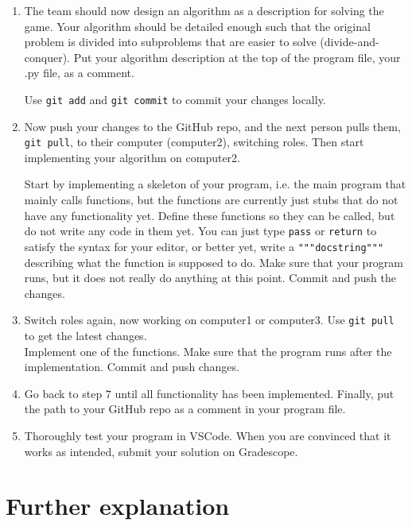 \begin{enumerate}
    \item
    The team should now design an algorithm as a description for solving the game.
    Your algorithm should be detailed enough
    such that the original problem is divided into subproblems
    that are easier to solve (divide-and-conquer).
    Put your algorithm description at the top of the program file, your .py file, as a comment.

    Use \texttt{git add} and \texttt{git commit} to commit your changes locally.

    \item
    Now push your changes to the GitHub repo,
    and the next person pulls them, \texttt{git pull}, to their computer (computer2), switching roles.
    Then start implementing your algorithm on computer2.

    Start by implementing a skeleton of your program, i.e. the main program that mainly calls functions,
    but the functions are currently just stubs that do not have any functionality yet.
    Define these functions so they can be called, but do not write any code in them yet.
    You can just type \texttt{pass} or \texttt{return} to satisfy the syntax for your editor,
    or better yet, write a \texttt{"""docstring"""} describing what the function is supposed to do.
    Make sure that your program runs, but it does not really do anything at this point.
    Commit and push the changes.

    \item Switch roles again, now working on computer1 or computer3.
    Use \texttt{git pull} to get the latest changes.\\
    Implement one of the functions.
    Make sure that the program runs after the implementation.
    Commit and push changes.

    \item Go back to step $7$ until all functionality has been implemented.
    Finally, put the path to your GitHub repo as a comment in your program file.

    \item Thoroughly test your program in VSCode.
    When you are convinced that it works as intended, submit your solution on Gradescope.

\end{enumerate}

\pagebreak
\section*{Further explanation}

